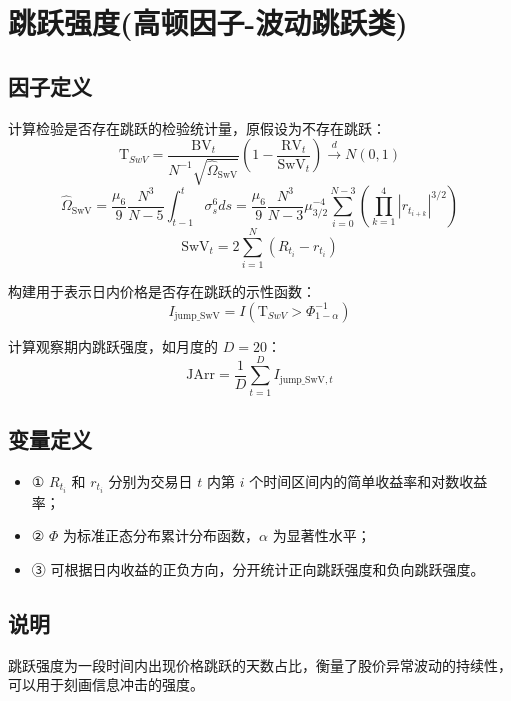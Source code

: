 \documentclass{article}
\begin{document}
\section{跳跃强度(高顿因子-波动跳跃类)}

\subsection{因子定义}

计算检验是否存在跳跃的检验统计量，原假设为不存在跳跃：
\begin{equation}
    \mathrm{T}_{SwV} = \frac{\mathrm{BV}_t}{N^{-1}\sqrt{\hat{\Omega}_{\mathrm{SwV}}}} \left(1 - \frac{\mathrm{RV}_t}{\mathrm{SwV}_t}\right) \xrightarrow{d} N(0,1)
\end{equation}
\begin{equation}
    \hat{\Omega}_{\mathrm{SwV}} = \frac{\mu_6}{9} \frac{N^3}{N - 5} \int_{t-1}^{t} \sigma_s^6 ds = \frac{\mu_6}{9} \frac{N^3}{N - 3}\mu_{3/2}^{-4}\sum_{i=0}^{N-3} (\prod_{k=1}^4|r_{t_{i+k}}|^{3/2})
\end{equation}
\begin{equation}
    \mathrm{SwV}_t = 2 \sum_{i=1}^N (R_{t_i} - r_{t_i})
\end{equation}

构建用于表示日内价格是否存在跳跃的示性函数：
\begin{equation}
    I_{\mathrm{jump\_SwV}} = I(\mathrm{T}_{SwV} > \Phi_{1-\alpha}^{-1})
\end{equation}

计算观察期内跳跃强度，如月度的 \( D = 20 \)：
\begin{equation}
    \mathrm{JArr} = \frac{1}{D} \sum_{t=1}^D I_{\mathrm{jump\_SwV},t}
\end{equation}

\subsection{变量定义}
\begin{itemize}
    \item ① \( R_{t_i} \) 和 \( r_{t_i} \) 分别为交易日 \( t \) 内第 \( i \) 个时间区间内的简单收益率和对数收益率；
    \item ② \( \Phi \) 为标准正态分布累计分布函数，\( \alpha \) 为显著性水平；
    \item ③ 可根据日内收益的正负方向，分开统计正向跳跃强度和负向跳跃强度。
\end{itemize}

\subsection{说明}
跳跃强度为一段时间内出现价格跳跃的天数占比，衡量了股价异常波动的持续性，可以用于刻画信息冲击的强度。
\end{document}
